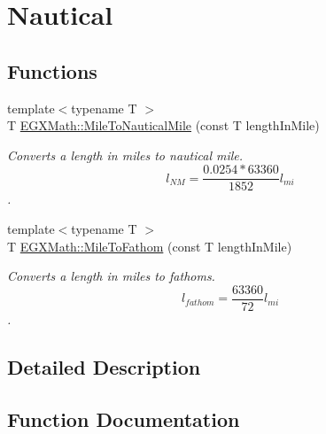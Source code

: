 \hypertarget{group___e_g_x_math-_conversions-_length_conversions-_imperial-_mile-_nautical}{}\section{Nautical}
\label{group___e_g_x_math-_conversions-_length_conversions-_imperial-_mile-_nautical}
\subsection*{Functions}
\begin{DoxyCompactItemize}
\item 
{\footnotesize template$<$typename T $>$ }\\T \mbox{\hyperlink{group___e_g_x_math-_conversions-_length_conversions-_imperial-_mile-_nautical_ga1f50d3e2d321bf020c3027501a2a5421}{E\+G\+X\+Math\+::\+Mile\+To\+Nautical\+Mile}} (const T length\+In\+Mile)
\begin{DoxyCompactList}\small\item\em Converts a length in miles to nautical mile. \[ l_{NM}= \frac{0.0254 * 63360}{1852} l_{mi} \]. \end{DoxyCompactList}\item 
{\footnotesize template$<$typename T $>$ }\\T \mbox{\hyperlink{group___e_g_x_math-_conversions-_length_conversions-_imperial-_mile-_nautical_gad8ee69c20f52894de8e71dd8c1eff9e7}{E\+G\+X\+Math\+::\+Mile\+To\+Fathom}} (const T length\+In\+Mile)
\begin{DoxyCompactList}\small\item\em Converts a length in miles to fathoms. \[ l_{fathom}= \frac{63360}{72} l_{mi} \]. \end{DoxyCompactList}\end{DoxyCompactItemize}


\subsection{Detailed Description}


\subsection{Function Documentation}
\mbox{\label{group___e_g_x_math-_conversions-_length_conversions-_imperial-_mile-_nautical_gad8ee69c20f52894de8e71dd8c1eff9e7}} 
